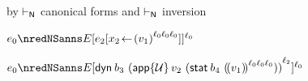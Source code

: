 {\begin{lamportproof*}
    \begin{pfproof}
        \begin{pfproof}
          by $\vdash_{\mathsf{N}}$ canonical forms and $\vdash_{\mathsf{N}}$ inversion
        \end{pfproof}
        \begin{pfproof}
          \qedstep
            \begin{pfproof}
              $\sexpr_0 \nredNSanns \ctx\ctxbars{\esubst{\sexpr_2}{\svar_2}{\obars{\svalue_1}{\fconcat{\sowner_0}{\fconcat{\sowner_0}{\sowner_0}}}}}{\sowner_0}$
            \end{pfproof}
        \end{pfproof}
        \begin{pfproof}
          \qedstep
            \begin{pfproof}
              \(\sexpr_0 \nredNSanns \ctx\ctxbars{\edynb{\sbnd_3}{\obars{\eapp{\tdyn}{\svalue_2}{(\estab{\sbnd_4}{\obbars{\svalue_1}{\fconcat{\sowner_0}{\fconcat{\sowner_0}{\sowner_0}}}})}}{\sowner_2}}}{\sowner_0}\)
            \end{pfproof}
        \end{pfproof}
    \end{pfproof}


\end{lamportproof*}}
